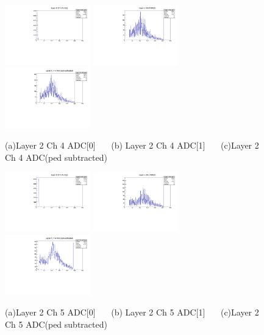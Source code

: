 \documentclass[a4paper,11pt]{article}
\theoremstyle{mytheor}
\begin{document}
\begin{figure}[H] 
\vspace*{-0.3cm} 
\includegraphics[width=0.33\textwidth,scale=0.5,trim=0 0 0 0,clip]{plotsdir/file0_muons-Layer2_Ch4_adc0-1.pdf} 
\includegraphics[width=0.33\textwidth,scale=0.5,trim=0 0 0 0,clip]{plotsdir/file0_muons-Layer2_Ch4_adc1-1.pdf} 
\includegraphics[width=0.33\textwidth,scale=0.5,trim=0 0 0 0,clip]{plotsdir/file0_muons-Layer2_Ch4_adcPedsub-1.pdf} 
\caption{(a)Layer 2 Ch 4 ADC[0] ~~~(b) Layer 2 Ch 4 ADC[1] ~~~(c)Layer 2 Ch 4 ADC(ped subtracted) } 
\end{figure} 
\begin{figure}[H] 
\vspace*{-0.3cm} 
\includegraphics[width=0.33\textwidth,scale=0.5,trim=0 0 0 0,clip]{plotsdir/file0_muons-Layer2_Ch5_adc0-1.pdf} 
\includegraphics[width=0.33\textwidth,scale=0.5,trim=0 0 0 0,clip]{plotsdir/file0_muons-Layer2_Ch5_adc1-1.pdf} 
\includegraphics[width=0.33\textwidth,scale=0.5,trim=0 0 0 0,clip]{plotsdir/file0_muons-Layer2_Ch5_adcPedsub-1.pdf} 
\caption{(a)Layer 2 Ch 5 ADC[0] ~~~(b) Layer 2 Ch 5 ADC[1] ~~~(c)Layer 2 Ch 5 ADC(ped subtracted) } 
\end{figure} 
\end{document}
